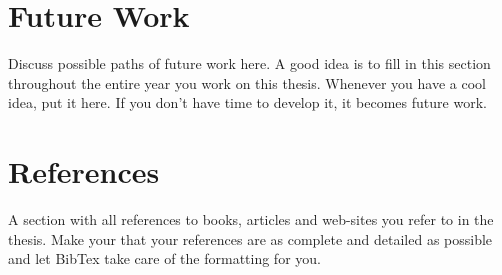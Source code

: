 \documentclass[twocolumn,british]{article}
\begin{document}
\section*{Future Work}

Discuss possible paths of future work here. A good idea is to fill in this section throughout the entire year you work on this thesis. Whenever you have a cool idea, put it here. If you don’t have time to develop it, it becomes future work.

\section*{References}
A section with all references to books, articles and web-sites you
refer to in the thesis. Make your that your references are as complete
and detailed as possible and let BibTex take care of the formatting
for you.
\end{document}
